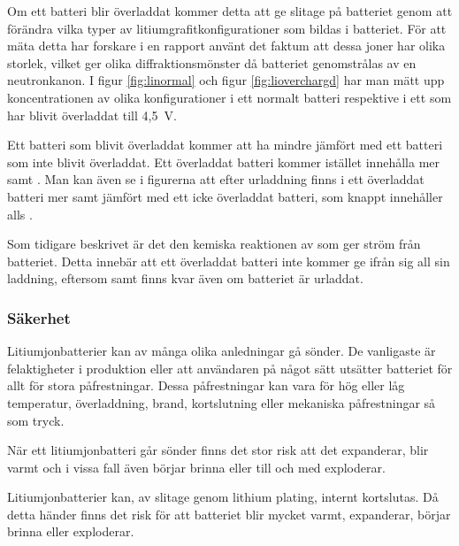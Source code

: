 \documentclass[a4paper,12pt]{article}
\begin{document}
Om ett batteri blir överladdat kommer detta att ge slitage på batteriet genom att förändra vilka typer av litiumgrafitkonfigurationer som bildas i batteriet. För att mäta detta har forskare i en rapport \cite{overcharging-type} använt det faktum att dessa joner har olika storlek, vilket ger olika diffraktionsmönster då batteriet genomstrålas av en neutronkanon. I figur \ref{fig:linormal} och figur \ref{fig:lioverchargd} har man mätt upp koncentrationen av olika konfigurationer i ett normalt batteri respektive i ett som har blivit överladdat till 4,5~V. 



Ett batteri som blivit överladdat kommer att ha mindre  jämfört med ett batteri som inte blivit överladdat. Ett överladdat batteri kommer istället innehålla mer  samt  \cite{overcharging-type}. Man kan även se i figurerna att efter urladdning finns i ett överladdat batteri mer  samt  jämfört med ett icke överladdat batteri, som knappt innehåller  alls \cite{overcharging-type}.



Som tidigare beskrivet är det den kemiska reaktionen av  som ger ström från batteriet. Detta innebär att ett överladdat batteri inte kommer ge ifrån sig all sin laddning, eftersom  samt  finns kvar även om batteriet är urladdat.

\subsubsection{Säkerhet}
\label{säkerhet}
Litiumjonbatterier kan av många olika anledningar gå sönder. De vanligaste är felaktigheter i produktion eller att användaren på något sätt utsätter batteriet för allt för stora påfrestningar. Dessa påfrestningar kan vara för hög eller låg temperatur, överladdning, brand, kortslutning eller mekaniska påfrestningar så som tryck. \cite{lihazard}

När ett litiumjonbatteri går sönder finns det stor risk att det expanderar, blir varmt och i vissa fall även börjar brinna eller till och med exploderar.

Litiumjonbatterier kan, av slitage genom lithium plating, internt kortslutas.\cite{nasa} Då detta händer finns det risk för att batteriet blir mycket varmt, expanderar, börjar brinna eller exploderar.
\end{document}
